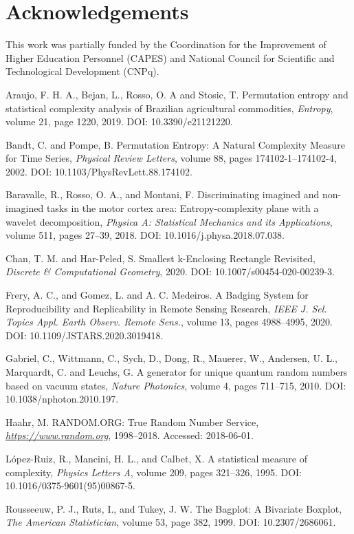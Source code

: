 \documentclass[a4,11pt]{pssbmac}
\begin{document}
\section*{Acknowledgements}

This work was partially funded by the Coordination for the Improvement of Higher Education Personnel (CAPES) and National Council for Scientific and Technological Development (CNPq).

\begin{thebibliography}{00}

 Araujo, F. H. A., Bejan, L., Rosso, O. A and Stosic, T. 
Permutation entropy and statistical complexity analysis of Brazilian agricultural commodities, 
{\it Entropy}, 
volume 21, 
page 1220,
2019. 
DOI: 10.3390/e21121220.

 Bandt, C. and Pompe, B.
Permutation Entropy: A Natural Complexity Measure for Time Series,
{\it Physical Review Letters}, 
volume 88, 
pages 174102-1--174102-4,
2002.
DOI: 10.1103/PhysRevLett.88.174102.

 Baravalle, R., Rosso, O. A., and Montani, F. 
Discriminating imagined and non-imagined tasks in the motor cortex area: Entropy-complexity plane with a wavelet decomposition, 
{\it Physica A: Statistical Mechanics and its Applications}, 
volume 511, 
pages 27--39,
2018. 
DOI: 10.1016/j.physa.2018.07.038.

 Chan, T. M. and Har-Peled, S.
Smallest k-Enclosing Rectangle Revisited,
{\it Discrete {\&} Computational Geometry},
2020. 
DOI: 10.1007/s00454-020-00239-3.

 Frery, A. C., and Gomez, L. and A. C. Medeiros.
A Badging System for Reproducibility and Replicability in Remote Sensing Research,
{\it IEEE J. Sel. Topics Appl. Earth Observ. Remote Sens.}, 
volume 13, 
pages 4988--4995,
2020.
DOI: 10.1109/JSTARS.2020.3019418.

 Gabriel, C., Wittmann, C., Sych, D., Dong, R., Mauerer, W., Andersen, U. L., Marquardt, C. and Leuchs, G.
A generator for unique quantum random numbers based on vacuum states,
{\it Nature Photonics}, 
volume 4, 
pages 711--715,
2010. 
DOI: 10.1038/nphoton.2010.197.

 Haahr, M.
RANDOM.ORG: True Random Number Service,
{\it \url{https://www.random.org}}, 
1998--2018. 
Accessed: 2018-06-01.

 L\'opez-Ruiz, R., Mancini, H. L., and Calbet, X.
A statistical measure of complexity, 
{\it Physics Letters A}, 
volume 209, 
pages 321--326,
1995. 
DOI: 10.1016/0375-9601(95)00867-5.

 Rousseeuw, P. J., Ruts, I., and Tukey, J. W.
The Bagplot: A Bivariate Boxplot,
{\it The American Statistician}, 
volume 53, 
page 382,
1999. 
DOI: 10.2307/2686061.

\end{thebibliography}
\end{document}

